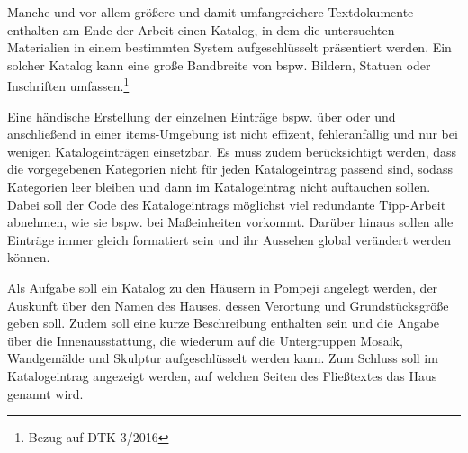 \makeatletter
{}
\makeatother
\fi

Manche und vor allem größere und damit umfangreichere Textdokumente enthalten am Ende der Arbeit einen Katalog, 
in dem die untersuchten Materialien in einem bestimmten System aufgeschlüsselt präsentiert werden.
Ein solcher Katalog kann eine große Bandbreite von bspw.  Bildern, Statuen oder Inschriften umfassen.\footnote{Bezug auf DTK 3/2016}

Eine händische Erstellung der einzelnen Einträge bspw. über  oder  
und anschließend in einer {items}-Umgebung ist nicht effizent, fehleranfällig und nur bei wenigen Katalogeinträgen einsetzbar.
Es muss zudem berücksichtigt werden, dass  die vorgegebenen Kategorien nicht für jeden Katalogeintrag passend sind, 
sodass  Kategorien leer bleiben  und dann im Katalogeintrag nicht auftauchen sollen.
Dabei soll der Code des Katalogeintrags möglichst viel redundante Tipp-Arbeit abnehmen, wie sie bspw. bei Maßeinheiten vorkommt.
Darüber hinaus sollen alle Einträge immer gleich formatiert sein und ihr Aussehen global verändert werden können.

Als Aufgabe soll ein Katalog zu den Häusern in Pompeji angelegt werden,
der Auskunft über den Namen des Hauses, dessen Verortung und Grundstücksgröße  geben soll.
Zudem soll eine kurze Beschreibung enthalten sein und die Angabe über die Innenausstattung, 
die wiederum auf die Untergruppen Mosaik, Wandgemälde und Skulptur aufgeschlüsselt werden kann. 
Zum Schluss soll im Katalogeintrag angezeigt werden, 
auf welchen Seiten des Fließtextes das Haus genannt wird.

